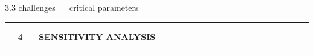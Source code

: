 \documentclass[11pt, compress, t, notes = noshow, xcolor = table, 
aspectratio = 1610]{beamer}
\newcommand{\highlight}[1]{\textcolor{highlightcol}{\textbf{#1}}}
\begin{document}
\begin{frame}{\textcolor{gray!90}{3.3 challenges} ~~ critical parameters}
\end{frame}


\LARGE
\begin{frame}[noframenumbering]{\phantom{foo}}
\normalsize
\vspace{-0.5cm}
\noindent \textcolor{gray!90}{\rule{\textwidth}{1pt}}
\smallskip

\Huge
\hspace{0pt}
\vfill
\textbf{\highlight{~~ 4 ~~ SENSITIVITY ANALYSIS}}
\vfill
\hspace{0pt}

\noindent \textcolor{gray!90}{\rule{\textwidth}{1pt}}

\end{frame}

\end{document}
